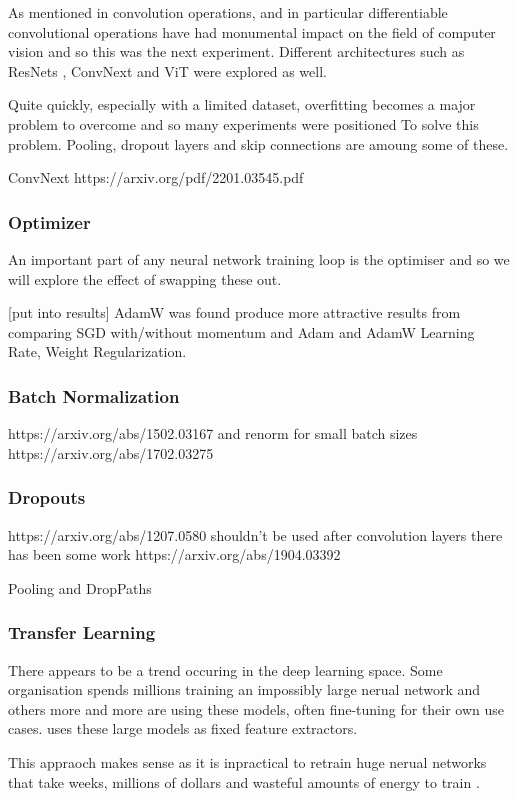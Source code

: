 As mentioned in  convolution operations, and in particular differentiable convolutional operations have had monumental 
impact on the field of computer vision and so this was the next experiment.  Different architectures such as ResNets \cite{}, ConvNext \cite{}
and ViT were explored as well.

Quite quickly, especially with a limited dataset, overfitting becomes a major problem to overcome and so many experiments were positioned To
solve this problem.  Pooling, dropout layers and skip connections are amoung some of these.

ConvNext https://arxiv.org/pdf/2201.03545.pdf

\subsubsection{Optimizer}
An important part of any neural network training loop is the optimiser and so we will explore the effect of swapping these out.

[put into results]
AdamW was found produce more attractive results from comparing SGD with/without momentum and Adam and AdamW \cite{}
Learning Rate, Weight Regularization.

\subsubsection{Batch Normalization}
https://arxiv.org/abs/1502.03167 and renorm for small batch sizes https://arxiv.org/abs/1702.03275

\subsubsection{Dropouts}
https://arxiv.org/abs/1207.0580 shouldn't be used after convolution layers \cite{} there has been some work https://arxiv.org/abs/1904.03392

Pooling and DropPaths

\subsubsection{Transfer Learning}
There appears to be a trend occuring in the deep learning space.  Some organisation spends millions training an impossibly large nerual network
and others more and more are using these models, often fine-tuning for their own use cases.  \cite{} uses these large models as fixed feature extractors.

This appraoch makes sense as it is inpractical to retrain huge nerual networks that take weeks, millions of dollars and wasteful amounts of energy
to train \cite{}.

